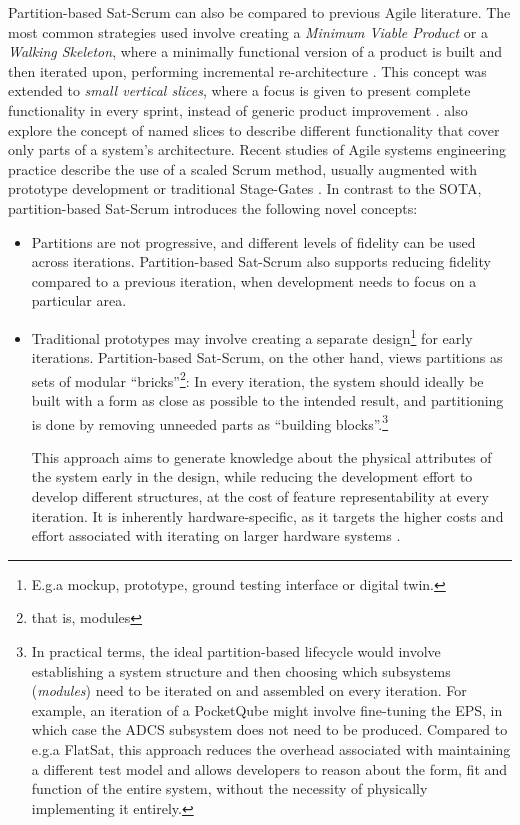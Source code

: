 \documentclass[a4paper,nobib,justified,final]{tufte-book}
\begin{document}
%
\label{sec:METHODOLOGY_partitionbased_novelty}
Partition-based Sat-Scrum can also be compared to previous Agile literature.
The most common strategies used involve creating a \emph{Minimum Viable Product} or a \emph{Walking Skeleton}, where a minimally functional version of a product is built and then iterated upon, performing incremental re-architecture \autocite{cockburnCrystalClearHumanpowered2004}. This concept was extended to \emph{small vertical slices}, where a focus is given to present complete functionality in every sprint, instead of generic product improvement \autocite{ratnerVerticalSlicingSmaller2011}. \citeauthor{iberleAgileGetsPhysical2022} also explore the concept of named slices to describe different functionality that cover only parts of a system's architecture. Recent studies of Agile systems engineering practice describe the use of a scaled Scrum method, usually augmented with prototype development or traditional Stage-Gates \NextCitationOffset{-0.8cm}\autocite{atzbergerAgileDevelopmentPhysical2020,cooperAgileDevelopmentManufacturing2023}. In contrast to the \acl{SOTA}, partition-based Sat-Scrum introduces the following novel concepts:
\begin{itemize}[itemsep=-2pt]
	\item Partitions are not progressive, and different levels of fidelity can be used across iterations. Partition-based Sat-Scrum also supports reducing fidelity compared to a previous iteration, when development needs to focus on a particular area.
	\item Traditional prototypes may involve creating a separate design\footnote[][-2.7cm]{E.g.\@ a mockup, prototype, ground testing interface or digital twin.} for early iterations. Partition-based Sat-Scrum, on the other hand, views partitions as sets of modular ``bricks''\footnote[][-2.8cm]{that is, modules}: In every iteration, the system should ideally be built with a form as close as possible to the intended result, and partitioning is done by removing unneeded parts as ``building blocks''.\footnote[][-3.8cm]{In practical terms, the ideal partition-based lifecycle would involve establishing a system structure and then choosing which subsystems (\emph{modules}) need to be iterated on and assembled on every iteration. For example, an iteration of a PocketQube might involve fine-tuning the \acl{EPS}, in which case the \acs{ADCS} subsystem does not need to be produced. Compared to e.g.\@ a FlatSat, this approach reduces the overhead associated with maintaining a different test model and allows developers to reason about the form, fit and function of the entire system, without the necessity of physically implementing it entirely.}
	
	This approach aims to generate knowledge about the physical attributes of the system early in the design, while reducing the development effort to develop different structures, at the cost of feature representability at every iteration. It is inherently hardware-specific, as it targets the higher costs and effort associated with iterating on larger hardware systems \autocite{schmidtAgileDevelopmentConstraints2017}.
\end{itemize} %
\end{document}

